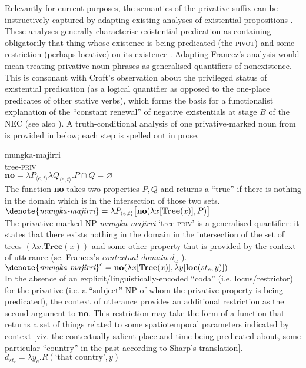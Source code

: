 \documentclass[output=paper]{langsci/langscibook}
\begin{document}
Relevantly for current purposes, the semantics of the privative suffix can
be instructively captured by adapting existing analyses of existential
propositions \citep[e.g.][]{Francez2007,Francez2011}. These analyses
generally characterise existential predication as containing obligatorily
that thing whose existence is being predicated (the \textsc{pivot}) and
some restriction (perhaps locative) on its existence \citep[the
\textsc{coda}; see][]{Francez2007}. Adapting Francez's analysis would mean
treating privative noun phrases as generalised quantifiers of nonexistence.
This is consonant with Croft's \citeyearpar[18]{Croft1991} observation
about the privileged status of existential predication (as a logical
quantifier as opposed to the one-place predicates of other stative verbs),
which forms the basis for a functionalist explanation of the ``constant
renewal'' of negative existentials at stage $B$ of the NEC (see also \citealt[173]{Veselinova2016}).
A truth-conditional analysis of one privative-marked noun from  is provided in  below; each step is spelled out in prose.
%
\begin{exe}\ex\label{ex:austr-truth-analysis} 
    \begin{xlist}
    \ex\gll mungka-majirri\\
tree-\textsc{priv}\\
%
\ex $\textbf{no}=\lambda P_{\langle e,t\rangle}\lambda Q_{\langle e,t\rangle}.P\cap Q=\varnothing$\hfill{\citep[e.g.][169]{BarwiseCooper1981}}\\
The function \textbf{no} takes two properties $P,Q$ and returns a ``true'' if there is nothing in the domain which is in the intersection of those two sets.
\ex\label{privsemsF} $\denote{\textit{mungka-majirri}}=\lambda P_{\langle e,t\rangle}\big[\textbf{no}(\lambda x[\textbf{Tree}(x)],P)\big]$\\
The privative-marked NP \textit{mungka-majirri} `tree\textsc{-priv}' is a generalised quantifier: it states that there exists nothing in the domain in the intersection of the set of trees $(\lambda x.\textbf{Tree}(x))$ and some other property that is provided by the context of utterance (sc. Francez's \textit{contextual domain} $d_\alpha$ \citeyearpar[1838]{Francez2011}).
        \ex\label{ex:austr-truth-analysis-fourth} 
        $\denote{\textit{mungka-majirri}}^c=\textbf{no}(\lambda x[\textbf{Tree}(x)],\lambda y[\textbf{loc}(st_c,y)])$\\
In the absence of an explicit\slash linguistically-encoded ``coda'' (i.e.
        locus\slash restrictor) for the privative (i.e. a ``subject'' NP of
        whom the privative-property is being predicated), the context of
        utterance provides an additional restriction as the second argument
        to \textbf{no}. This restriction may take the form of a function
        that returns a set of things related to some spatiotemporal
        parameters indicated by context [viz. the contextually
        salient place and time being predicated about, some particular
        ``country'' in the past according to Sharp's translation].
    $d_{st_c}=\lambda y_e.R(\text{`that country'},y)$ \end{xlist}\end{exe}
\end{document}
